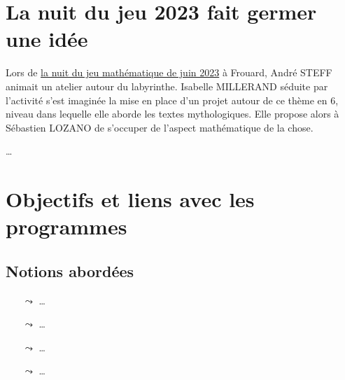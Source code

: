 \section{La nuit du jeu 2023 fait germer une idée}
Lors de \href{https://partage.apmeplorraine.fr/petitVert/PV155.pdf#page=5}{la nuit du jeu mathématique de juin 2023} à Frouard,
André STEFF animait un atelier autour du labyrinthe. Isabelle MILLERAND séduite par l'activité s'est imaginée la mise en place d'un projet autour 
de ce thème en 6, niveau dans lequelle elle aborde les textes mythologiques. Elle propose alors à Sébastien LOZANO de s'occuper de l'aspect mathématique 
de la chose.

\dots

\section{Objectifs et liens avec les programmes}
\subsection{Notions abordées}
    \begin{itemize}
        \item[$\leadsto$] \dots
        \item[$\leadsto$] \dots
        \item[$\leadsto$] \dots
        \item[$\leadsto$] \dots
    \end{itemize}

